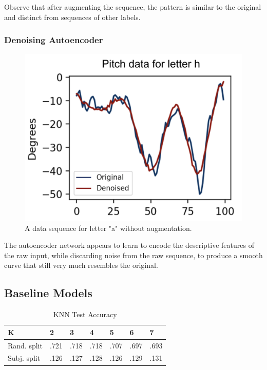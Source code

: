 \documentclass{article}
\begin{document}
\begin{multicols*}{2}
Observe that after augmenting the sequence, the pattern is similar to the original and distinct from sequences of other labels.

\subsubsection{Denoising Autoencoder}
\begin{figure}[H]
    \centering
    \includegraphics[scale = 0.21]{autoencode.png}
    \caption{A data sequence for letter "a" without augmentation.}
\end{figure}

\vspace{-15px}

The autoencoder network appears to learn to encode the descriptive features of the raw input, while discarding noise from the raw sequence, to produce a smooth curve that still very much resembles the original.


\subsection{Baseline Models}


\begin{table}[H]
\centering
\begin{tabular}{lllllll}
\hline
K           & 2    & 3    & 4    & 5    & 6    & 7    \\ \hline
Rand. split & .721 & .718 & .718 & .707 & .697 & .693 \\
Subj. split & .126 & .127 & .128 & .126 & .129 & .131 \\ \hline
\end{tabular}
\caption{KNN Test Accuracy}
\label{tab:knn-acc}
\end{table}


\end{multicols*}
\end{document}
